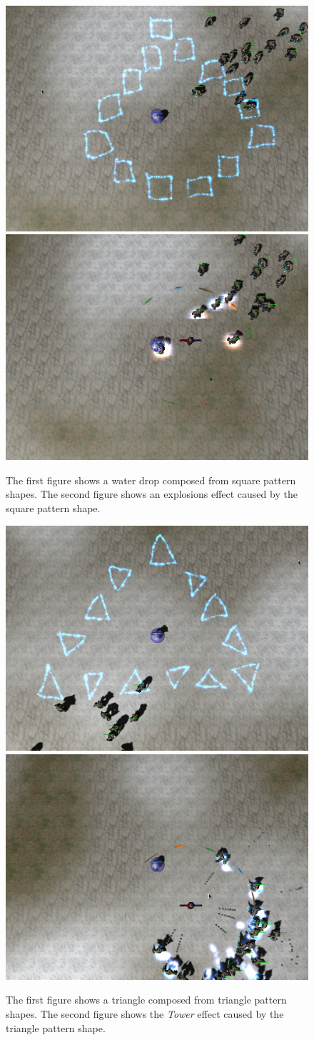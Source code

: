 \begin{figure}[p]
\centering
\includegraphics[width=.47\linewidth]{ext/scr/patsquare.png}
\quad
\includegraphics[width=.47\linewidth]{ext/scr/patsquaree.png}
\caption{The first figure shows a water drop composed from square pattern shapes. The second figure shows an explosions effect caused by the square pattern shape. }
\label{fig:spell:patsquare}
\end{figure}

\begin{figure}[p]
\centering
\includegraphics[width=.47\linewidth]{ext/scr/pattriangle.png}
\quad
\includegraphics[width=.47\linewidth]{ext/scr/pattrianglee.png}
\caption{The first figure shows a triangle composed from triangle pattern shapes. The second figure shows the \emph{Tower} effect caused by the triangle pattern shape. }
\label{fig:spell:pattriangle}
\end{figure}

